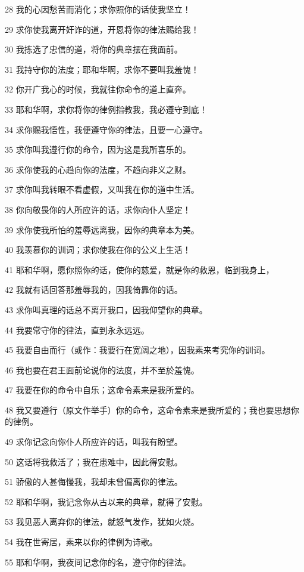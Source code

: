 \par 28 我的心因愁苦而消化；求你照你的话使我坚立！
\par 29 求你使我离开奸诈的道，开恩将你的律法赐给我！
\par 30 我拣选了忠信的道，将你的典章摆在我面前。
\par 31 我持守你的法度；耶和华啊，求你不要叫我羞愧！
\par 32 你开广我心的时候，我就往你命令的道上直奔。
\par 33 耶和华啊，求你将你的律例指教我，我必遵守到底！
\par 34 求你赐我悟性，我便遵守你的律法，且要一心遵守。
\par 35 求你叫我遵行你的命令，因为这是我所喜乐的。
\par 36 求你使我的心趋向你的法度，不趋向非义之财。
\par 37 求你叫我转眼不看虚假，又叫我在你的道中生活。
\par 38 你向敬畏你的人所应许的话，求你向仆人坚定！
\par 39 求你使我所怕的羞辱远离我，因你的典章本为美。
\par 40 我羡慕你的训词；求你使我在你的公义上生活！
\par 41 耶和华啊，愿你照你的话，使你的慈爱，就是你的救恩，临到我身上，
\par 42 我就有话回答那羞辱我的，因我倚靠你的话。
\par 43 求你叫真理的话总不离开我口，因我仰望你的典章。
\par 44 我要常守你的律法，直到永永远远。
\par 45 我要自由而行（或作：我要行在宽阔之地），因我素来考究你的训词。
\par 46 我也要在君王面前论说你的法度，并不至於羞愧。
\par 47 我要在你的命令中自乐；这命令素来是我所爱的。
\par 48 我又要遵行（原文作举手）你的命令，这命令素来是我所爱的；我也要思想你的律例。
\par 49 求你记念向你仆人所应许的话，叫我有盼望。
\par 50 这话将我救活了；我在患难中，因此得安慰。
\par 51 骄傲的人甚侮慢我，我却未曾偏离你的律法。
\par 52 耶和华啊，我记念你从古以来的典章，就得了安慰。
\par 53 我见恶人离弃你的律法，就怒气发作，犹如火烧。
\par 54 我在世寄居，素来以你的律例为诗歌。
\par 55 耶和华啊，我夜间记念你的名，遵守你的律法。
